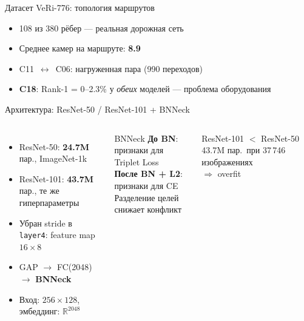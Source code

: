 \documentclass[aspectratio=169,12pt]{beamer}
\begin{document}
\begin{frame}{Датасет VeRi-776: топология маршрутов}
  \begin{itemize}\setlength{\itemsep}{10pt}
    \item 108 из 380 рёбер --- реальная дорожная сеть
    \item Среднее камер на маршруте: \textbf{8.9}
    \item C11~$\leftrightarrow$~C06: нагруженная пара (990 переходов)
    \item \textcolor{bad}{\textbf{C18}}: Rank-1 = 0--2.3\% у \emph{обеих} моделей --- проблема оборудования
  \end{itemize}
\end{frame}

\begin{frame}{Архитектура: ResNet-50 / ResNet-101 + BNNeck}
  \begin{columns}[T,onlytextwidth]
    \begin{itemize}\setlength{\itemsep}{7pt}
      \item ResNet-50: \textbf{24.7M} пар., ImageNet-1k
      \item ResNet-101: \textbf{43.7M} пар., те же гиперпараметры
      \item Убран stride в \texttt{layer4}: feature map $16{\times}8$
      \item GAP $\to$ FC(2048) $\to$ \textbf{BNNeck}
      \item Вход: $256\times128$, эмбеддинг: $\mathbb{R}^{2048}$
    \end{itemize}
    \begin{block}{BNNeck}
      \small
      \textbf{До BN}: признаки для Triplet Loss\\[0.3em]
      \textbf{После BN + L2}: признаки для CE\\[0.3em]
      Разделение целей снижает конфликт
    \end{block}
    \vspace{0.5em}
    \begin{alertblock}{ResNet-101 $<$ ResNet-50}
      \small
      43.7M пар.\ при 37\,746 изображениях\\$\Rightarrow$ overfit
    \end{alertblock}
  \end{columns}
\end{frame}
\end{document}
